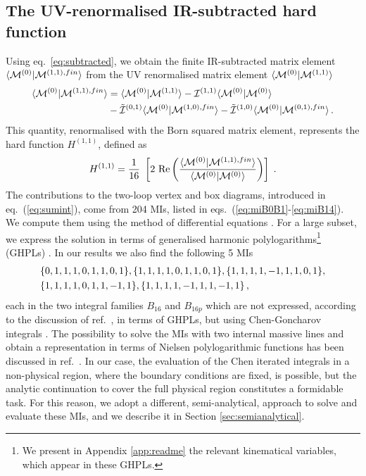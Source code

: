 \documentclass[11pt,a4paper]{article}
\begin{document}
\subsection{The UV-renormalised IR-subtracted hard function}
Using eq.~\eqref{eq:subtracted},
we obtain the finite IR-subtracted matrix element $\langle {\cal M}^{(0)} | {\cal M}^{(1,1),fin} \rangle$
from the UV renormalised matrix element $\langle {\cal M}^{(0)} | {\cal M}^{(1,1)} \rangle$
%
\begin{align}
\langle {\cal M}^{(0)} | {\cal M}^{(1,1),fin} \rangle &= \langle {\cal M}^{(0)} | {\cal M}^{(1,1)} \rangle -  {\cal I}^{(1,1)} \langle {\cal M}^{(0)}  | {\cal M}^{(0)} \rangle
\nonumber\\&
                                                 - \tilde{{\cal I}}^{(0,1)} \langle {\cal M}^{(0)} | {\cal M}^{(1,0),fin} \rangle
                                                 - \tilde{{\cal I}}^{(1,0)} \langle {\cal M}^{(0)} | {\cal M}^{(0,1),fin} \rangle \,.
\end{align}
  This quantity, renormalised with the Born squared matrix element, represents the hard function $H^{(1,1)}$,
  defined as
\begin{equation}
% 
 H^{(1,1)} =
 \frac{1}{16}~
\left[
  2 ~ {\rm Re} \left( \frac{\langle \M^{(0)} | \M^{(1,1),fin} \rangle}{\langle \M^{(0)} | \M^{(0)} \rangle} \right)
\right]
  \;.
\end{equation}
%
The contributions to the two-loop vertex and box diagrams,
introduced in eq.~(\ref{eq:sumint}),
come from 204 MIs, listed in eqs.~(\ref{eq:miB0B1}-\ref{eq:miB14}).
We compute them
using the method of differential equations \cite{Kotikov:1990kg,Remiddi:1997ny,Gehrmann:1999as,Argeri:2007up,Henn:2014qga,Ablinger:2015tua,Ablinger:2018zwz}.
For a large subset, we express the solution
in terms of generalised harmonic polylogarithms\footnote{
We present in Appendix \ref{app:readme} the relevant kinematical variables, which appear in these GHPLs.}
(GHPLs) \cite{Goncharov:polylog,Goncharov:2001iea,Remiddi:1999ew}.
In our results we also find
the following 5 MIs
\begin{align}
  & \{0, 1, 1, 1, 0, 1, 1, 0, 1\},
  \{1, 1, 1, 1, 0, 1, 1, 0, 1\},  \{1, 1, 1, 1, -1, 1, 1, 0, 1\},  \nonumber \\&
  \{1, 1, 1, 1, 0, 1, 1, -1, 1\}, \{1, 1, 1, 1, -1, 1, 1, -1, 1\}\, ,
\label{eq:boxmis}
\end{align}
%
each in the two integral families $B_{16}$ and $B_{16p}$
which are not expressed,
according to the discussion of ref.~\cite{Bonciani:2016ypc},
in terms of GHPLs,
%
but using Chen-Goncharov integrals \cite{Chen:1977oja}.
The possibility to solve the MIs with two internal massive lines
and obtain a representation in terms of Nielsen polylogarithmic functions
has been discussed in ref.~\cite{Heller:2019gkq}.
%
In our case, the evaluation of the Chen iterated integrals \cite{Chen:1977oja}
in a non-physical region, where the boundary conditions are fixed, is possible,
but the analytic continuation to cover the full physical region
constitutes a formidable task.
For this reason, we adopt a different, semi-analytical, approach
to solve and evaluate these MIs,
and we describe it in Section \ref{sec:semianalytical}.
\end{document}
